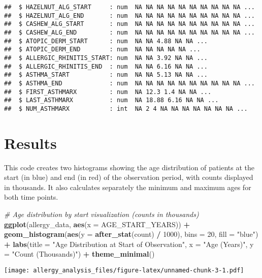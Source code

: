 \documentclass[
]{article}
\newenvironment{Shaded}{\begin{snugshade}}{\end{snugshade}}
\newcommand{\AttributeTok}[1]{\textcolor[rgb]{0.13,0.29,0.53}{#1}}
\newcommand{\CommentTok}[1]{\textcolor[rgb]{0.56,0.35,0.01}{\textit{#1}}}
\newcommand{\DecValTok}[1]{\textcolor[rgb]{0.00,0.00,0.81}{#1}}
\newcommand{\FunctionTok}[1]{\textcolor[rgb]{0.13,0.29,0.53}{\textbf{#1}}}
\newcommand{\NormalTok}[1]{#1}
\newcommand{\SpecialCharTok}[1]{\textcolor[rgb]{0.81,0.36,0.00}{\textbf{#1}}}
\newcommand{\StringTok}[1]{\textcolor[rgb]{0.31,0.60,0.02}{#1}}
\begin{document}
\begin{verbatim}
##  $ HAZELNUT_ALG_START     : num  NA NA NA NA NA NA NA NA NA NA ...
##  $ HAZELNUT_ALG_END       : num  NA NA NA NA NA NA NA NA NA NA ...
##  $ CASHEW_ALG_START       : num  NA NA NA NA NA NA NA NA NA NA ...
##  $ CASHEW_ALG_END         : num  NA NA NA NA NA NA NA NA NA NA ...
##  $ ATOPIC_DERM_START      : num  NA NA 4.88 NA NA ...
##  $ ATOPIC_DERM_END        : num  NA NA NA NA NA ...
##  $ ALLERGIC_RHINITIS_START: num  NA NA 3.92 NA NA ...
##  $ ALLERGIC_RHINITIS_END  : num  NA NA 6.16 NA NA ...
##  $ ASTHMA_START           : num  NA NA 5.13 NA NA ...
##  $ ASTHMA_END             : num  NA NA NA NA NA NA NA NA NA NA ...
##  $ FIRST_ASTHMARX         : num  NA 12.3 1.4 NA NA ...
##  $ LAST_ASTHMARX          : num  NA 18.88 6.16 NA NA ...
##  $ NUM_ASTHMARX           : int  NA 2 4 NA NA NA NA NA NA NA ...
\end{verbatim}

\section{Results}\label{results}

This code creates two histograms showing the age distribution of
patients at the start (in blue) and end (in red) of the observation
period, with counts displayed in thousands. It also calculates
separately the minimum and maximum ages for both time points.

\begin{Shaded}
\begin{Highlighting}[]
\CommentTok{\# Age distribution by start visualization (counts in thousands)}
\FunctionTok{ggplot}\NormalTok{(allergy\_data, }\FunctionTok{aes}\NormalTok{(}\AttributeTok{x =}\NormalTok{ AGE\_START\_YEARS)) }\SpecialCharTok{+}
  \FunctionTok{geom\_histogram}\NormalTok{(}\FunctionTok{aes}\NormalTok{(}\AttributeTok{y =} \FunctionTok{after\_stat}\NormalTok{(count) }\SpecialCharTok{/} \DecValTok{1000}\NormalTok{), }\AttributeTok{bins =} \DecValTok{20}\NormalTok{, }\AttributeTok{fill =} \StringTok{"blue"}\NormalTok{) }\SpecialCharTok{+}
  \FunctionTok{labs}\NormalTok{(}\AttributeTok{title =} \StringTok{"Age Distribution at Start of Observation"}\NormalTok{,}
       \AttributeTok{x =} \StringTok{"Age (Years)"}\NormalTok{,}
       \AttributeTok{y =} \StringTok{"Count (Thousands)"}\NormalTok{) }\SpecialCharTok{+}
  \FunctionTok{theme\_minimal}\NormalTok{()}
\end{Highlighting}
\end{Shaded}

\texttt{[image: allergy\_analysis\_files/figure-latex/unnamed-chunk-3-1.pdf]}
\end{document}
